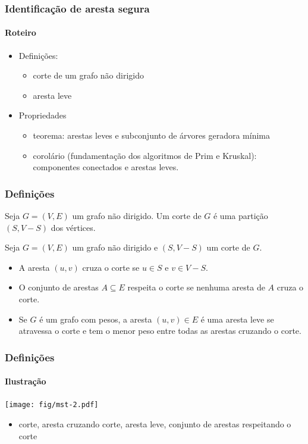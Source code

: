 \documentclass{beamer}
\begin{document}
\begin{frame}
\frametitle{Identificação de aresta segura}
\framesubtitle{Roteiro}

\begin{itemize}
\item Definições:
\begin{itemize}
\item corte de um grafo não dirigido
\item aresta leve
\end{itemize}
\item Propriedades
\begin{itemize}
\item teorema: arestas leves e subconjunto de árvores geradora mínima
\item corolário (fundamentação dos algoritmos de Prim e Kruskal):
  componentes conectados e arestas leves.
\end{itemize}
\end{itemize}
\end{frame}

\begin{frame}
\frametitle{Definições}

\begin{definition}[Corte]
Seja $G=(V, E)$ um grafo não dirigido. Um \alert{corte} de $G$ é uma
partição $(S, V - S)$ dos vértices.
\end{definition}

\begin{definition}
Seja $G=(V, E)$ um grafo não dirigido e $(S, V - S)$ um corte de
$G$. 
\begin{itemize}
\item A aresta $(u, v)$ \alert{cruza} o corte se $u \in S$ e $v \in
  V-S$.
\item O conjunto de arestas $A \subseteq E$ \alert{respeita} o corte
  se nenhuma aresta de $A$ cruza o corte.
\item Se $G$ é um grafo com pesos, a aresta $(u, v) \in E$ é uma
  \alert{aresta leve} se atravessa o corte e tem o menor peso entre
  todas as arestas cruzando o corte.
\end{itemize}
\end{definition}

\end{frame}

\begin{frame}
\frametitle{Definições}
\framesubtitle{Ilustração}

\begin{center}
\texttt{[image: fig/mst-2.pdf]}
\end{center}

\begin{itemize}
\item corte, aresta cruzando corte, aresta leve, conjunto de arestas
respeitando o corte
\end{itemize}

\end{frame}
\end{document}
